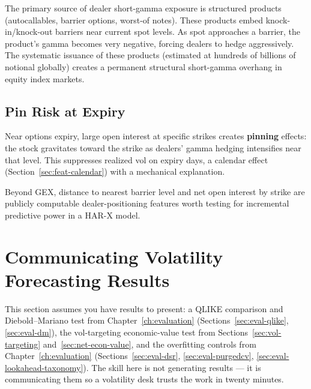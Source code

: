 The primary source of dealer short-gamma exposure is structured products (autocallables, barrier options, worst-of notes).
These products embed knock-in/knock-out barriers near current spot levels.
As spot approaches a barrier, the product's gamma becomes very negative, forcing dealers to hedge aggressively.
The systematic issuance of these products (estimated at hundreds of billions of notional globally) creates a permanent structural short-gamma overhang in equity index markets.

\subsection{Pin Risk at Expiry}

Near options expiry, large open interest at specific strikes creates \textbf{pinning} effects: the stock gravitates toward the strike as dealers' gamma hedging intensifies near that level.
This suppresses realized vol on expiry days, a calendar effect (Section~\ref{sec:feat-calendar}) with a mechanical explanation.

\begin{application}
Beyond GEX, distance to nearest barrier level and net open interest by strike are publicly computable dealer-positioning features worth testing for incremental predictive power in a HAR-X model.
\end{application}


\section{Communicating Volatility Forecasting Results}
\label{sec:communicating-results}

\begin{prereq}[Background]
This section assumes you have results to present: a QLIKE comparison and Diebold--Mariano test from Chapter~\ref{ch:evaluation} (Sections~\ref{sec:eval-qlike}, \ref{sec:eval-dm}), the vol-targeting economic-value test from Sections~\ref{sec:vol-targeting} and~\ref{sec:net-econ-value}, and the overfitting controls from Chapter~\ref{ch:evaluation} (Sections~\ref{sec:eval-dsr}, \ref{sec:eval-purgedcv}, \ref{sec:eval-lookahead-taxonomy}). The skill here is not generating results --- it is communicating them so a volatility desk trusts the work in twenty minutes.
\end{prereq}

